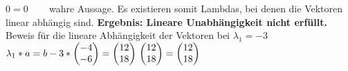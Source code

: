 \documentclass[10pt,ngerman]{scrartcl}
\begin{document}
\begin{enumerate}[1.]
\begin{enumerate}[(a)]
\begin{math}
	0 = 0 \end{math} ~~~ wahre Aussage. Es existieren somit Lambdas, bei denen die Vektoren linear abhängig sind.\newline
	\textbf{Ergebnis: Lineare Unabhängigkeit nicht erfüllt.}\newline~\newline
	Beweis für die lineare Abhängigkeit der Vektoren bei $\lambda _1 = -3$\newline
	\begin{math}
	\lambda _1 *a = b\newline
	-3 * \begin{pmatrix}-4 \\ -6\end{pmatrix} = \begin{pmatrix}12 \\ 18\end{pmatrix} \newline
	\begin{pmatrix}12 \\ 18\end{pmatrix} = \begin{pmatrix}12 \\ 18\end{pmatrix} \newline \end{math}\newline
	~\newline
	~\newline
	

\end{enumerate}
\end{enumerate}
\end{document}
